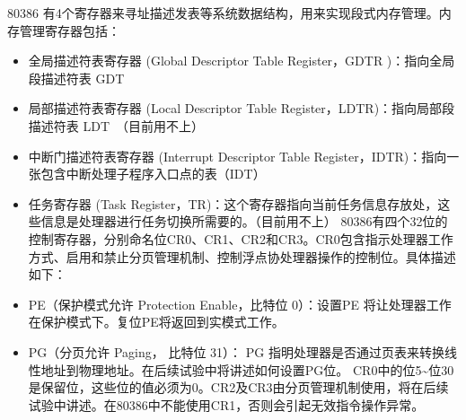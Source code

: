 80386
有4个寄存器来寻址描述发表等系统数据结构，用来实现段式内存管理。内存管理寄存器包括：

\begin{itemize}
\item
  全局描述符表寄存器 (Global Descriptor Table Register，GDTR
  )：指向全局段描述符表 GDT
\item
  局部描述符表寄存器 (Local Descriptor Table
  Register，LDTR)：指向局部段描述符表 LDT~（目前用不上）
\item
  中断门描述符表寄存器 (Interrupt Descriptor Table
  Register，IDTR)：指向一张包含中断处理子程序入口点的表（IDT）~
\item
  任务寄存器 (Task
  Register，TR)：这个寄存器指向当前任务信息存放处，这些信息是处理器进行任务切换所需要的。（目前用不上）
  80386有四个32位的控制寄存器，分别命名位CR0、CR1、CR2和CR3。CR0包含指示处理器工作方式、启用和禁止分页管理机制、控制浮点协处理器操作的控制位。具体描述如下：
\item
  PE（保护模式允许 Protection Enable，比特位 0）：设置PE
  将让处理器工作在保护模式下。复位PE将返回到实模式工作。
\item
  PG（分页允许 Paging， 比特位 31）： PG
  指明处理器是否通过页表来转换线性地址到物理地址。在后续试验中将讲述如何设置PG位。
  CR0中的位5\textasciitilde{}位30是保留位，这些位的值必须为0。CR2及CR3由分页管理机制使用，将在后续试验中讲述。在80386中不能使用CR1，否则会引起无效指令操作异常。
\end{itemize}
